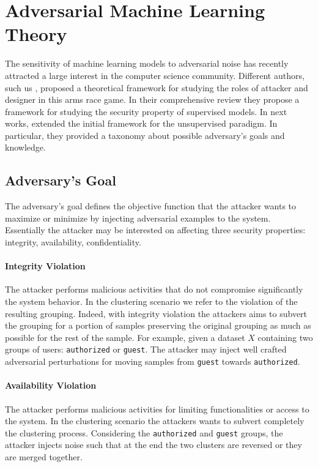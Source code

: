 \section{Adversarial Machine Learning Theory}
The sensitivity of machine learning models to adversarial noise has recently attracted a large interest in the computer science community. Different authors, such us \citeauthor{wildpatterns}, proposed a theoretical framework for studying the roles of attacker and designer in this arms race game. In their comprehensive review \cite{wildpatterns} they propose a framework for studying the security property of supervised models. In next works, \citeauthor{isdataclustering} \cite{isdataclustering} extended the initial framework for the unsupervised paradigm. In particular, they provided a taxonomy about possible adversary's goals and knowledge.


\subsection{Adversary's Goal}
The adversary's goal defines the objective function that the attacker wants to maximize or minimize by injecting adversarial examples to the system. Essentially the attacker may be interested on affecting three security properties: integrity, availability, confidentiality. 

\paragraph{Integrity Violation}
The attacker performs malicious activities that do not compromise significantly the system behavior. In the clustering scenario we refer to the violation of the resulting grouping. Indeed, with integrity violation the attackers aims to subvert the grouping for a portion of samples preserving the original grouping as much as possible for the rest of the sample. For example, given a dataset $X$ containing two groups of users: \texttt{authorized} or \texttt{guest}. The attacker may inject well crafted adversarial perturbations for moving samples from \texttt{guest} towards \texttt{authorized}.


\paragraph{Availability Violation} 
The attacker performs malicious activities for limiting functionalities or access to the system. In the clustering scenario the attackers wants to subvert completely the clustering process. Considering the \texttt{authorized} and \texttt{guest} groups, the attacker injects noise such that at the end the two clusters are reversed or they are merged together.

